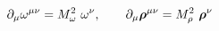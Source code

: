 \begin{equation}
\partial_\mu \omega^{\mu\nu}= M_\omega^2~\omega^\nu,~~~~~~\partial_\mu \mbox{\boldmath$\rho$}^{\mu\nu}=M_\rho^2~ \mbox{\boldmath$\rho$}^\nu   
\end{equation}

